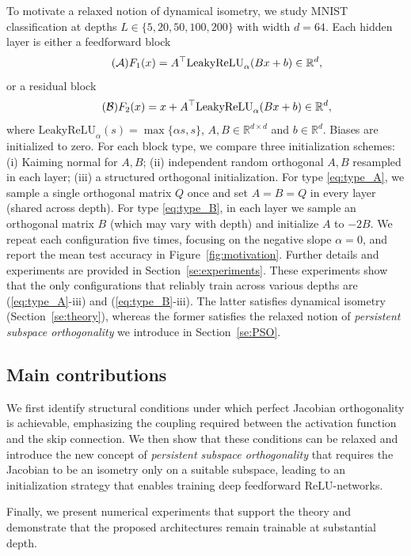 \documentclass{article}
\theoremstyle{plain}
\theoremstyle{definition}
\theoremstyle{definition}
\theoremstyle{remark}
\theoremstyle{definition}
\theoremstyle{definition}
\theoremstyle{remark}
\numberwithin{equation}{section}
\begin{document}
To motivate a relaxed notion of dynamical isometry, we study MNIST classification at depths $L\in\{5,20,50,100, 200\}$ with width $d=64$. Each hidden layer is either a feedforward block
\begin{equation}\tag{$\mathcal{A}$}\label{eq:type_A}
F_1(x)=A^\top \mathrm{LeakyReLU}_\alpha(Bx+b)\in\mathbb{R}^d,
\end{equation}
or a residual block
\begin{equation}\tag{$\mathcal{B}$}\label{eq:type_B}
F_2(x)=x+A^\top \mathrm{LeakyReLU}_\alpha(Bx+b)\in\mathbb{R}^d,
\end{equation}
where $\mathrm{LeakyReLU}_\alpha(s)=\max\{\alpha s,s\}$, $A,B\in\mathbb{R}^{d\times d}$ and $b\in\mathbb{R}^d$. Biases are initialized to zero. For each block type, we compare three initialization schemes: (i) Kaiming normal for $A,B$; (ii) independent random orthogonal $A,B$ resampled in each layer; (iii) a structured orthogonal initialization. For type \eqref{eq:type_A}, we sample a single orthogonal matrix $Q$ once and set $A=B=Q$ in every layer (shared across depth). For type \eqref{eq:type_B}, in each layer we sample an orthogonal matrix $B$ (which may vary with depth) and initialize $A$ to  $- 2B$. We repeat each configuration five times, focusing on the negative slope $\alpha=0$, and report the mean test accuracy in Figure~\ref{fig:motivation}. Further details and experiments are provided in Section~\ref{se:experiments}. These experiments show that the only configurations that reliably train across various depths are (\ref{eq:type_A}-iii) and (\ref{eq:type_B}-iii). The latter satisfies dynamical isometry (Section~\ref{se:theory}), whereas the former satisfies the relaxed notion of \emph{persistent subspace orthogonality} we introduce in Section~\ref{se:PSO}. 

\subsection*{Main contributions}
We first identify structural conditions under which perfect Jacobian orthogonality is achievable, emphasizing the coupling required between the activation function and the skip connection. We then show that these conditions can be relaxed and introduce the new concept of \emph{persistent subspace orthogonality} that requires the Jacobian to be an isometry only on a suitable subspace, leading to an initialization strategy that enables training deep feedforward $\mathrm{ReLU}$-networks.

Finally, we present numerical experiments that support the theory and demonstrate that the proposed architectures remain trainable at substantial depth.
\end{document}
